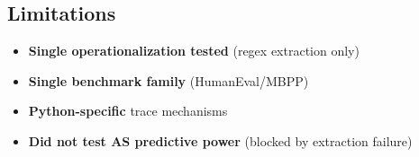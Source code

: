 \subsection{Limitations}

\begin{itemize}
    \item \textbf{Single operationalization tested} (regex extraction only)
    \item \textbf{Single benchmark family} (HumanEval/MBPP)
    \item \textbf{Python-specific} trace mechanisms
    \item \textbf{Did not test AS predictive power} (blocked by extraction failure)
\end{itemize}
